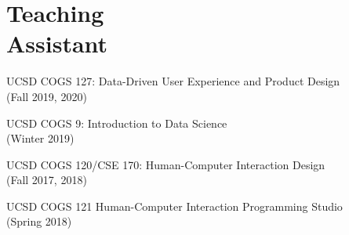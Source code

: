 \section{Teaching\\Assistant}

\begin{innerlist}
\item UCSD COGS 127: Data-Driven User Experience and Product Design  \\ (Fall 2019, 2020)
\item UCSD COGS 9: Introduction to Data Science  \\ (Winter 2019)
\item UCSD COGS 120/CSE 170: Human-Computer Interaction Design \\ (Fall 2017, 2018)
\item UCSD COGS 121 Human-Computer Interaction Programming Studio \\ (Spring 2018)
\end{innerlist}

\begin{comment}

\section{} \vspace{0.2in} \textbf{SERVICE} \vspace{0.05in}

\section{External Paper\\Reviewer}

The Journal of Open Source Software (2018), The American Statistician (2017)

\section{} \vspace{0.2in} \textbf{SOFTWARE} \vspace{0.05in}

\begin{innerlist}
\item Ian Drosos [C.33]
\item Logan Gittelson
\item Sean Kross [C.39]
\item Jaime Montoya
\item Xiong Zhang [C.36,C.43]
\end{innerlist}

\end{comment}

